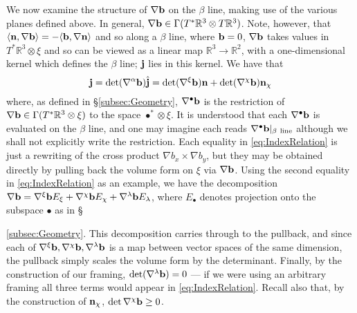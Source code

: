 We now examine the structure of $\nabla \mathbf{b}$ on the $\beta$ line, making use of the various planes defined above. In general, $\nabla \mathbf{b} \in \Gamma(T^*\mathbb{R}^3 \otimes T\mathbb{R}^3)$. Note, however, that $\langle \mathbf{n}, \nabla \mathbf{b} \rangle = - \langle \mathbf{b} , \nabla \mathbf{n} \rangle$ and so along a $\beta$ line, where $\mathbf{b}=0$, $\nabla \mathbf{b}$ takes values in $T^*\mathbb{R}^3 \otimes \xi$ and so can be viewed as a linear map $\mathbb{R}^3 \rightarrow \mathbb{R}^2$, with a one-dimensional kernel which defines the $\beta$ line; $\mathbf{j}$ lies in this kernel. We have that 
\begin{equation}
    \mathbf{j} = \mathrm{det}(\nabla^{\alpha} \mathbf{b}) \hat{\mathbf{j}} = \mathrm{det}(\nabla^\xi \mathbf{b}) \mathbf{n} + \mathrm{det}(\nabla^\chi \mathbf{b}) \mathbf{n}_\chi
\label{eq:IndexRelation}
\end{equation}
where, as defined in \S{\ref{subsec:Geometry}}, $\nabla^\bullet \mathbf{b}$ is the restriction of $\nabla \mathbf{b} \in \Gamma(T^*\mathbb{R}^3 \otimes \xi) $ to the space $\bullet^* \otimes \xi$. It is understood that each $\nabla^\bullet \mathbf{b}$ is evaluated on the $\beta$ line, and one may imagine each reads $\nabla^\bullet \w b |_{\beta\ \mathrm{line}}$ although we shall not explicitly write the restriction. Each equality in \eqref{eq:IndexRelation} is just a rewriting of the cross product $\nabla b_x \times \nabla b_y$, but they may be obtained directly by pulling back the volume form on $\xi$ via $\nabla \mathbf{b}$. Using the second equality  in \eqref{eq:IndexRelation} as an example, we have the decomposition $\nabla \mathbf{b} = \nabla^\xi \mathbf{b} E_\xi + \nabla^\chi \mathbf{b} E_\chi+ \nabla^\lambda \mathbf{b} E_\lambda$, where $E_\bullet$ denotes projection onto the subspace $\bullet$ as in \S{\ref{subsec:Geometry}. This decomposition carries through to the pullback, and since each of $\nabla^\xi \mathbf{b} , \nabla^\chi \mathbf{b},\nabla^\lambda \mathbf{b} $ is a map between vector spaces of the same dimension, the pullback simply scales the volume form by the determinant. Finally, by the construction of our framing, $\mathrm{det}(\nabla^\lambda \mathbf{b}) =0$ --- if we were using an arbitrary framing all three terms would appear in \eqref{eq:IndexRelation}. Recall also that, by the construction of $\mathbf{n}_\chi$, $\det\nabla^\chi \mathbf{b} \geq 0$.

}
